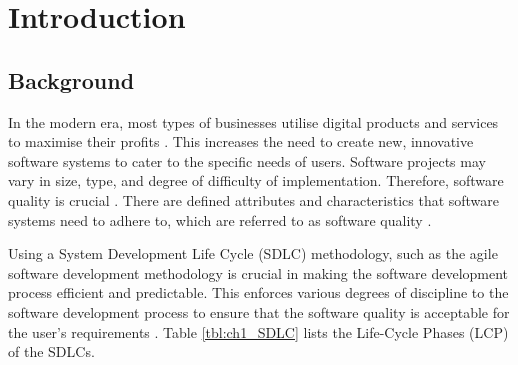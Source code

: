 \chapter{Introduction}
\label{chap:1}

\section{Background}\label{section:ch1_background}
In the modern era, most types of businesses utilise digital products and services to maximise their profits \cite{Gralha2018}. This increases the need to create new, innovative software systems to cater to the specific needs of users. Software projects may vary in size, type, and degree of difficulty of implementation. Therefore, software quality is crucial \cite{Khan2013}. There are defined attributes and characteristics that software systems need to adhere to, which are referred to as software quality \cite{Khan2013}.\par Using a System Development Life Cycle (SDLC) methodology, such as the agile software development methodology is crucial in making the software development process efficient and predictable. This enforces various degrees of discipline to the software development process to ensure that the software quality is acceptable for the user's requirements \cite{Khan2013, Al-Saiyd2015}. Table \ref{tbl:ch1_SDLC} lists the Life-Cycle Phases (LCP) of the SDLCs.

